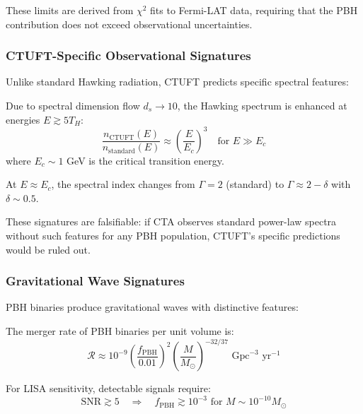 These limits are derived from $\chi^2$ fits to Fermi-LAT data, requiring that the PBH contribution does not exceed observational uncertainties.

\subsubsection{CTUFT-Specific Observational Signatures}

Unlike standard Hawking radiation, CTUFT predicts specific spectral features:

\begin{prediction}
Due to spectral dimension flow $d_s \to 10$, the Hawking spectrum is enhanced at energies $E \gtrsim 5 T_H$:
\begin{equation}
    \frac{n_{\text{CTUFT}}(E)}{n_{\text{standard}}(E)} \approx \left(\frac{E}{E_c}\right)^{3} \quad \text{for } E \gg E_c
\end{equation}
where $E_c \sim 1$ GeV is the critical transition energy.
\end{prediction}

\begin{prediction}
At $E \approx E_c$, the spectral index changes from $\Gamma = 2$ (standard) to $\Gamma \approx 2 - \delta$ with $\delta \sim 0.5$.
\end{prediction}

These signatures are falsifiable: if CTA observes standard power-law spectra without such features for any PBH population, CTUFT's specific predictions would be ruled out.

\subsubsection{Gravitational Wave Signatures}

PBH binaries produce gravitational waves with distinctive features:

\begin{theorem}
The merger rate of PBH binaries per unit volume is:
\begin{equation}
    \mathcal{R} \approx 10^{-9} \left(\frac{f_{\text{PBH}}}{0.01}\right)^2 \left(\frac{M}{M_\odot}\right)^{-32/37} \text{ Gpc}^{-3} \text{ yr}^{-1}
\end{equation}
\end{theorem}

For LISA sensitivity, detectable signals require:
\begin{equation}
    \text{SNR} \gtrsim 5 \quad \Rightarrow \quad f_{\text{PBH}} \gtrsim 10^{-3} \text{ for } M \sim 10^{-10} M_\odot
\end{equation}

